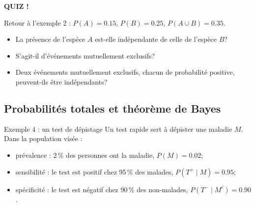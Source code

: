 \documentclass{BeamerTemplate}
\begin{document}
\begin{frame}[plain,t]
  \centerline{\LARGE\bfseries\alert{QUIZ !}}

  \medskip
  Retour à l'exemple 2 : $P(A) = 0.15$, $P(B) = 0.25$, $P(A \cup B) = 0.35$.

  \begin{itemize}\itemsep 1.5cm
    \item La présence de l'espèce $A$ est-elle indépendante de celle de
      l'espèce $B$?
    \item S'agit-il d'événements mutuellement exclusifs?
    \item<2-> Deux événements mutuellement exclusifs, chacun de probabilité
      positive, peuvent-ils être indépendants?
  \end{itemize}
\end{frame}

\subsection{Probabilités totales et théorème de Bayes}

\begin{frame}[t]{Exemple 4 : un test de dépistage}
  Un test rapide sert à dépister une maladie $M$. Dans la population visée :
  \begin{itemize}\itemsep 2mm
    \item \alert{prévalence} : 2\,\% des personnes ont la maladie,
      \hfill $P(M) = 0.02$;
    \item \alert{sensibilité} : le test est positif chez 95\,\% des malades,
      \hfill $P(T^+ \mid M) = 0.95$;
    \item \alert{spécificité} : le test est négatif chez 90\,\% des
      non-malades, \hfill $P(T^- \mid M^c) = 0.90$.
  \end{itemize}

  \medskip

  \medskip
\end{frame}
\end{document}
